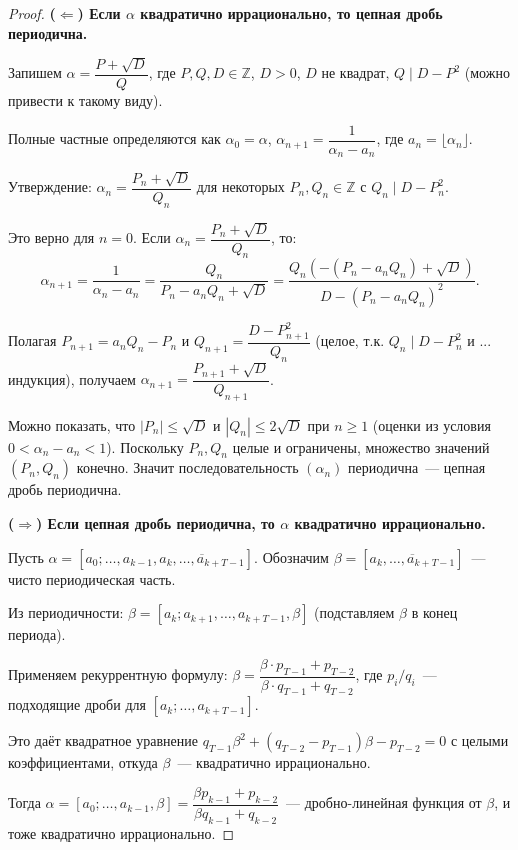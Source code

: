 \documentclass[12pt]{article}
\begin{document}
	\begin{proof}
		\textbf{($\Leftarrow$) Если $\alpha$ квадратично иррационально, то цепная дробь периодична.}
		
		Запишем $\alpha = \dfrac{P + \sqrt{D}}{Q}$, где $P, Q, D \in \mathbb{Z}$, $D > 0$, $D$ не квадрат, $Q \mid D - P^2$ (можно привести к такому виду).
		
		Полные частные определяются как $\alpha_0 = \alpha$, $\alpha_{n+1} = \dfrac{1}{\alpha_n - a_n}$, где $a_n = \lfloor \alpha_n \rfloor$.
		
		Утверждение: $\alpha_n = \dfrac{P_n + \sqrt{D}}{Q_n}$ для некоторых $P_n, Q_n \in \mathbb{Z}$ с $Q_n \mid D - P_n^2$.
		
		Это верно для $n = 0$. Если $\alpha_n = \dfrac{P_n + \sqrt{D}}{Q_n}$, то:
		\[\alpha_{n+1} = \frac{1}{\alpha_n - a_n} = \frac{Q_n}{P_n - a_n Q_n + \sqrt{D}} = \frac{Q_n(-(P_n - a_n Q_n) + \sqrt{D})}{D - (P_n - a_n Q_n)^2}.\]
		
		Полагая $P_{n+1} = a_n Q_n - P_n$ и $Q_{n+1} = \dfrac{D - P_{n+1}^2}{Q_n}$ (целое, т.к. $Q_n \mid D - P_n^2$ и ... индукция), получаем $\alpha_{n+1} = \dfrac{P_{n+1} + \sqrt{D}}{Q_{n+1}}$.
		
		Можно показать, что $|P_n| \leqslant \sqrt{D}$ и $|Q_n| \leqslant 2\sqrt{D}$ при $n \geqslant 1$ (оценки из условия $0 < \alpha_n - a_n < 1$). Поскольку $P_n, Q_n$ целые и ограничены, множество значений $(P_n, Q_n)$ конечно. Значит последовательность $(\alpha_n)$ периодична~--- цепная дробь периодична.
		
		\textbf{($\Rightarrow$) Если цепная дробь периодична, то $\alpha$ квадратично иррационально.}
		
		Пусть $\alpha = [a_0; \dots, a_{k-1}, \overline{a_k, \dots, a_{k+T-1}}]$. Обозначим $\beta = [{\overline{a_k, \dots, a_{k+T-1}}}]$~--- чисто периодическая часть.
		
		Из периодичности: $\beta = [a_k; a_{k+1}, \dots, a_{k+T-1}, \beta]$ (подставляем $\beta$ в конец периода).
		
		Применяем рекуррентную формулу: $\beta = \dfrac{\beta \cdot p_{T-1} + p_{T-2}}{\beta \cdot q_{T-1} + q_{T-2}}$, где $p_i/q_i$~--- подходящие дроби для $[a_k; \dots, a_{k+T-1}]$.
		
		Это даёт квадратное уравнение $q_{T-1} \beta^2 + (q_{T-2} - p_{T-1})\beta - p_{T-2} = 0$ с целыми коэффициентами, откуда $\beta$~--- квадратично иррационально.
		
		Тогда $\alpha = [a_0; \dots, a_{k-1}, \beta] = \dfrac{\beta p_{k-1} + p_{k-2}}{\beta q_{k-1} + q_{k-2}}$~--- дробно-линейная функция от $\beta$, и тоже квадратично иррационально.
	\end{proof}
	
\end{document}
